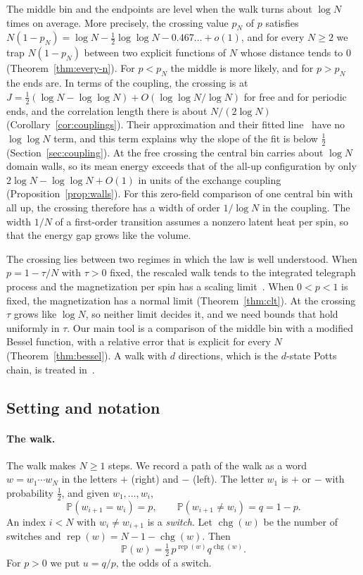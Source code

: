 \documentclass[11pt]{article}
\theoremstyle{definition}
\theoremstyle{remark}
\newcommand{\Prob}{\mathbb{P}}
\newcommand{\chg}{\operatorname{chg}}
\newcommand{\rep}{\operatorname{rep}}
\newcommand{\sR}{\mathord{+}}
\newcommand{\sL}{\mathord{-}}
\begin{document}
The middle bin and the endpoints are level when the walk turns about $\log N$
times on average. More precisely, the crossing value $p_N$ of $p$ satisfies
$N(1-p_N)=\log N-\frac12\log\log N-0.467\ldots+o(1)$, and for every $N\ge2$
we trap $N(1-p_N)$ between two explicit functions of $N$ whose distance tends
to $0$ (Theorem~\ref{thm:every-n}). For $p<p_N$ the middle is more likely, and
for $p>p_N$ the ends are. In terms of the coupling, the crossing is at
$J=\frac12(\log N-\log\log N)+O(\log\log N/\log N)$ for free and for periodic
ends, and the correlation length there is about $N/(2\log N)$
(Corollary~\ref{cor:couplings}). Their approximation and their fitted line~\cite{stepanyan2024}
have no $\log\log N$ term, and this term explains why the slope of the
fit is below $\frac12$ (Section~\ref{sec:coupling}). At the
free crossing the central bin carries about $\log N$ domain walls, so its mean energy
exceeds that of the all-up configuration by only $2\log N-\log\log N+O(1)$
in units of the exchange coupling (Proposition~\ref{prop:walls}). For this zero-field comparison of one
central bin with all up, the crossing therefore has a width of order
$1/\log N$ in the coupling. The width $1/N$ of a first-order transition
assumes a nonzero latent heat per spin, so that the energy gap grows like the volume.

The crossing lies between two regimes in which the law is well understood.
When $p=1-\tau/N$ with $\tau>0$ fixed, the rescaled walk tends to the integrated
telegraph process and the magnetization per spin has a scaling
limit~\cite[Theorem~2.1 and Remark~3.4]{herrmann2010}. When $0<p<1$ is fixed,
the magnetization has a normal limit (Theorem~\ref{thm:clt}). At the crossing $\tau$ grows
like $\log N$, so neither limit decides it, and we need bounds that hold
uniformly in $\tau$. Our main tool is a comparison of the middle bin with a
modified Bessel function, with a relative error that is explicit for every $N$
(Theorem~\ref{thm:bessel}). A walk with $d$ directions, which
is the $d$-state Potts chain, is treated in~\cite{paperB}.

\subsection{Setting and notation}\label{sec:setting}

\paragraph{The walk.} The walk makes $N\ge1$ steps. We record a path of the walk as a word
$w=w_1\cdots w_N$ in the letters $\sR$ (right) and $\sL$ (left). The letter $w_1$
is $\sR$ or $\sL$ with probability $\frac12$, and given $w_1,\dots,w_i$,
\[
\Prob(w_{i+1}=w_i)=p,\qquad \Prob(w_{i+1}\ne w_i)=q=1-p .
\]
An index $i<N$ with $w_i\ne w_{i+1}$ is a \emph{switch}. Let $\chg(w)$ be the
number of switches and $\rep(w)=N-1-\chg(w)$. Then
\begin{equation}\label{eq:wordprob}
\Prob(w)=\tfrac12\,p^{\rep(w)}q^{\chg(w)} .
\end{equation}
For $p>0$ we put $u=q/p$, the odds of a switch.
\end{document}
